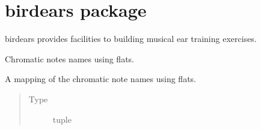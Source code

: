 \documentclass[letterpaper,10pt,english]{sphinxmanual}
\begin{document}
\chapter{birdears package}
\label{\detokenize{birdears:module-birdears}}\label{\detokenize{birdears:birdears-package}}\label{\detokenize{birdears::doc}}
\sphinxAtStartPar
birdears provides facilities to building musical ear training exercises.

\begin{fulllineitems}
\label{\detokenize{birdears:birdears.CHROMATIC_FLAT}}
\sphinxAtStartPar
Chromatic notes names using flats.

\sphinxAtStartPar
A mapping of the chromatic note names using flats.
\begin{quote}\begin{description}
\item[{Type}] \leavevmode
\sphinxAtStartPar
tuple

\end{description}\end{quote}

\end{fulllineitems}

\end{document}
